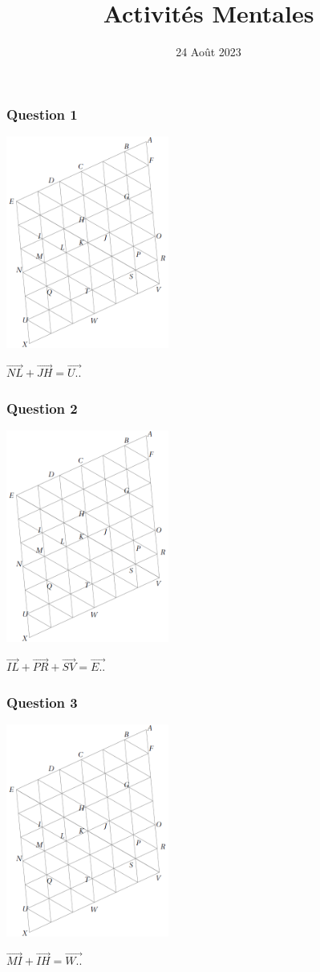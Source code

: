 \documentclass[15pt, mathserif]{beamer}
\title{Activités Mentales}
\date{24 Août 2023}
\begin{document}
\begin{frame}
    \titlepage
\end{frame}

\begin{frame} 
	\frametitle{Question 1}
\begin{center} 
 \includegraphics[width=0.4\textwidth]{GrilleIso2} \end{center}$\overrightarrow{NL}+\overrightarrow{JH}=\overrightarrow{U..}$  \end{frame}


\begin{frame} 
	\frametitle{Question 2}
\begin{center} 
 \includegraphics[width=0.4\textwidth]{GrilleIso2} \end{center}$\overrightarrow{IL}+\overrightarrow{PR}+\overrightarrow{SV}=\overrightarrow{E..}$  \end{frame}


\begin{frame} 
	\frametitle{Question 3}
\begin{center} 
 \includegraphics[width=0.4\textwidth]{GrilleIso2} \end{center}$\overrightarrow{MI}+\overrightarrow{IH}=\overrightarrow{W..}$  \end{frame}
\end{document}
